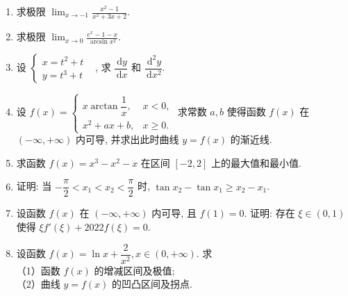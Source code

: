 \documentclass{hfutexam}
\newcommand{\diff}{\,\mathrm{d}}
\begin{document}
\begin{enumerate}
\item 求极限 $\displaystyle\lim_{x\to-1}\frac{x^2-1}{x^2+3x+2}$.
\item 求极限 $\displaystyle\lim_{x\to0}\frac{e^x-1-x}{\arcsin x^2}$.
\item 设 $\begin{cases}x=t^2+t&\\y=t^3+t&\end{cases}$, 求 $\dfrac{\diff y}{\diff x}$ 和 $\dfrac{\diff^2 y}{\diff x^2}$.
\item 设 $f(x)=\begin{cases}x\arctan\dfrac1x,&x<0,\\x^2+ax+b,&x\ge0.\end{cases}$
求常数 $a,b$ 使得函数 $f(x)$ 在 $(-\infty,+\infty)$ 内可导, 并求出此时曲线 $y=f(x)$ 的渐近线.
\item	求函数 $f(x)=x^3-x^2-x$ 在区间 $[-2,2]$ 上的最大值和最小值.
\item 证明: 当 $-\dfrac\pi2<x_1<x_2<\dfrac\pi2$ 时, $\tan x_2-\tan x_1\ge x_2-x_1$.
\item 设函数 $f(x)$ 在 $(-\infty,+\infty)$ 内可导, 且 $f(1)=0$.
证明: 存在 $\xi\in(0,1)$ 使得 $\xi f'(\xi)+2022f(\xi)=0$.
\item 设函数 $f(x)=\ln x+\dfrac2{x^2}, x\in(0,+\infty)$. 求\vspace{10pt}\\
\indent （1）函数 $f(x)$ 的增减区间及极值;\\
\indent （2）曲线 $y=f(x)$ 的凹凸区间及拐点.
\end{enumerate}
\end{document}
